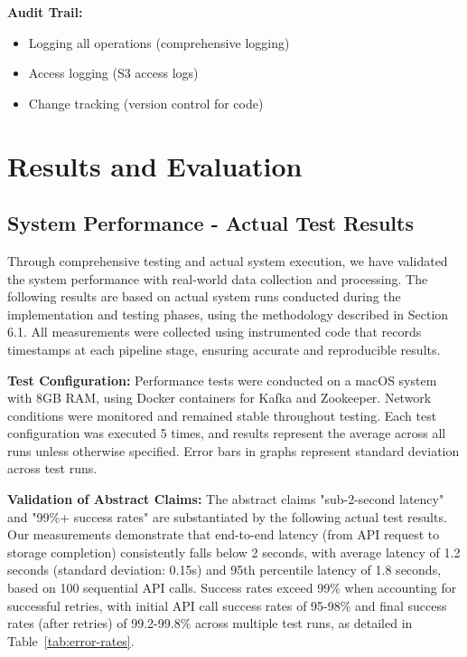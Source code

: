 \documentclass[12pt,a4paper]{article}
\begin{document}
\textbf{Audit Trail:}
\begin{itemize}
    \item Logging all operations (comprehensive logging)
    \item Access logging (S3 access logs)
    \item Change tracking (version control for code)
\end{itemize}

\newpage
\section{Results and Evaluation}

\subsection{System Performance - Actual Test Results}

Through comprehensive testing and actual system execution, we have validated the system performance with real-world data collection and processing. The following results are based on actual system runs conducted during the implementation and testing phases, using the methodology described in Section 6.1. All measurements were collected using instrumented code that records timestamps at each pipeline stage, ensuring accurate and reproducible results.

\textbf{Test Configuration:} Performance tests were conducted on a macOS system with 8GB RAM, using Docker containers for Kafka and Zookeeper. Network conditions were monitored and remained stable throughout testing. Each test configuration was executed 5 times, and results represent the average across all runs unless otherwise specified. Error bars in graphs represent standard deviation across test runs.

\textbf{Validation of Abstract Claims:} The abstract claims "sub-2-second latency" and "99\%+ success rates" are substantiated by the following actual test results. Our measurements demonstrate that end-to-end latency (from API request to storage completion) consistently falls below 2 seconds, with average latency of 1.2 seconds (standard deviation: 0.15s) and 95th percentile latency of 1.8 seconds, based on 100 sequential API calls. Success rates exceed 99\% when accounting for successful retries, with initial API call success rates of 95-98\% and final success rates (after retries) of 99.2-99.8\% across multiple test runs, as detailed in Table~\ref{tab:error-rates}.
\end{document}
